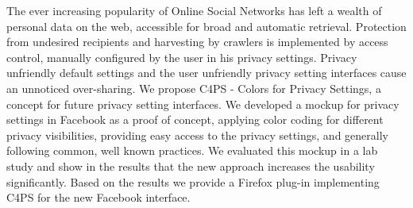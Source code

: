 \begin{itemize}
The ever increasing popularity of Online Social Networks has left a wealth of
personal data on the web, accessible for broad and automatic retrieval.
Protection from undesired recipients and harvesting by crawlers is implemented
by access control, manually configured by the user in his privacy settings.
Privacy unfriendly default settings and the user unfriendly privacy setting
interfaces cause an unnoticed over-sharing. We propose C4PS - Colors for Privacy
Settings, a concept for future privacy setting interfaces. We developed a mockup
for privacy settings in Facebook as a proof of concept, applying color coding
for different privacy visibilities, providing easy access to the privacy
settings, and generally following common, well known practices. We evaluated
this mockup in a lab study and show in the results that the new approach
increases the usability significantly. Based on the results we provide a Firefox
plug-in implementing C4PS for the new Facebook interface.
\end{itemize}

